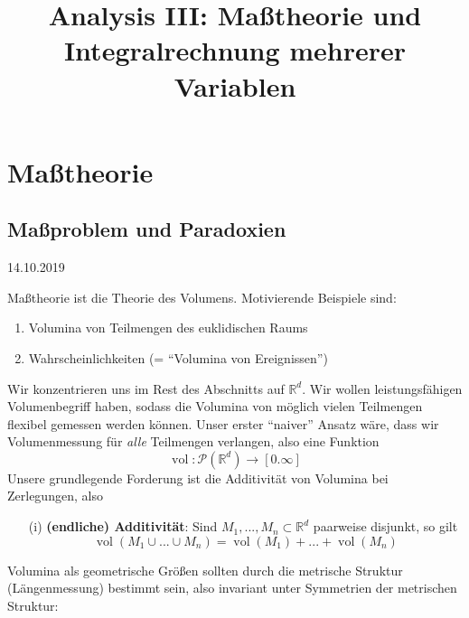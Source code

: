 \documentclass[12pt,a4paper]{article}
\title{Analysis III: Maßtheorie und Integralrechnung mehrerer Variablen}
\theoremstyle{definition}
\theoremstyle{remark}
\newcommand{\R}{\mathbb{R}}
\newcommand{\vol}{\operatorname{vol}}
\begin{document}
\maketitle
\tableofcontents
{}
\newpage
\section{Maßtheorie}
\subsection{Maßproblem und Paradoxien}
\begin{scriptsize}
\begin{flushright}
14.10.2019
\end{flushright}
\end{scriptsize}
Maßtheorie ist die Theorie des Volumens. Motivierende Beispiele sind:
\begin{enumerate}[label=\roman*),topsep=3pt, itemsep=0pt]
\item Volumina von Teilmengen des euklidischen Raums
\item Wahrscheinlichkeiten (= ``Volumina von Ereignissen'')
\end{enumerate}
Wir konzentrieren uns im Rest des Abschnitts auf $\R^d$. Wir wollen leistungsfähigen Volumenbegriff haben, sodass die Volumina von möglich vielen Teilmengen flexibel gemessen werden können. Unser erster ``naiver'' Ansatz wäre, dass wir Volumenmessung für \emph{alle} Teilmengen verlangen, also eine Funktion
\begin{equation}
 \vol: \mathcal{P}(\R^d) \longrightarrow [0.\infty]
\end{equation}
Unsere grundlegende Forderung ist die Additivität von Volumina bei Zerlegungen, also
\begin{enumerate}
\item[(i)] \textbf{(endliche) Additivität}: Sind $M_1,...,M_n\subset \R^d$ paarweise disjunkt, so gilt
\begin{equation}
\vol (M_1\cup ... \cup M_n) = \vol(M_1)+...+\vol (M_n)
\end{equation}
\end{enumerate}
Volumina als geometrische Größen sollten durch die metrische Struktur (Längenmessung) bestimmt sein, also invariant unter Symmetrien der metrischen Struktur:
\end{document}
